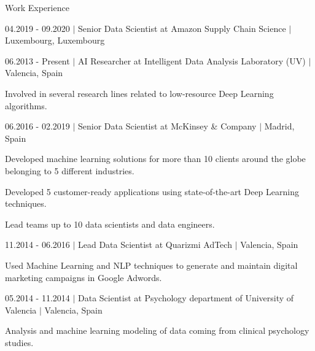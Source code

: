 \documentclass{resume} %
\begin{document}
\begin{rSection}{Work Experience}
\begin{rSubsection}{04.2019 - 09.2020 $|$ Senior Data Scientist at Amazon Supply Chain Science  $|$  \textnormal{Luxembourg, Luxembourg}}{}{}
\end{rSubsection}

	\vspace{-3pt}

\begin{rSubsection}{06.2013 - Present $|$ AI Researcher at Intelligent Data Analysis Laboratory (UV) $|$ \textnormal{Valencia, Spain}\hspace{-10pt}}{}{}

	\vspace{-3pt}

	\item Involved in several research lines related to low-resource Deep Learning algorithms.

\end{rSubsection}

	\vspace{-3pt}

\begin{rSubsection}{06.2016 - 02.2019 $|$ Senior Data Scientist at McKinsey \& Company  $|$ \textnormal{Madrid, Spain}}{}{}

    \vspace{-3pt}

    \item Developed machine learning solutions for more than 10 clients around the globe belonging to 5 different industries.
    \item Developed 5 customer-ready applications using state-of-the-art Deep Learning techniques.
    \item Lead teams up to 10 data scientists and data engineers.
\end{rSubsection}

	\vspace{-3pt}

\begin{rSubsection}{11.2014 - 06.2016 $|$ Lead Data Scientist at Quarizmi AdTech  $|$  \textnormal{Valencia, Spain}}{}{}

    \vspace{-3pt}

    \item Used Machine Learning and NLP techniques to generate and maintain digital marketing campaigns in Google Adwords.
\end{rSubsection}

	\vspace{-3pt}

\begin{rSubsection}{05.2014 - 11.2014 $|$ Data Scientist at Psychology department of University of Valencia  $|$  \textnormal{Valencia, Spain}}{}{}

    \vspace{-3pt}

    \item Analysis and machine learning modeling of data coming from clinical psychology studies.

\end{rSubsection}


\end{rSection}
\end{document}
